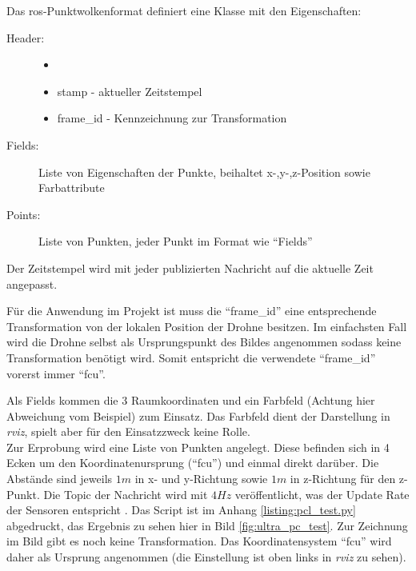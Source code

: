 Das \acrshort{ros}-Punktwolkenformat definiert eine Klasse mit den Eigenschaften:
\begin{description}
    \item[Header:]
    \begin{itemize}
        \item[]
        \item stamp - aktueller Zeitstempel
        \item frame\_id - Kennzeichnung zur Transformation
    \end{itemize}
    \item[Fields:] Liste von Eigenschaften der Punkte, beihaltet x-,y-,z-Position sowie Farbattribute
    \item[Points:] Liste von Punkten, jeder Punkt im Format wie \enquote{Fields}
\end{description}

Der Zeitstempel wird mit jeder publizierten Nachricht auf die aktuelle Zeit angepasst.

Für die Anwendung im Projekt ist muss die \enquote{frame\_id} eine entsprechende Transformation von der lokalen Position der Drohne besitzen. Im einfachsten Fall wird die Drohne selbst als Ursprungspunkt des Bildes angenommen sodass keine Transformation benötigt wird. Somit entspricht die verwendete \enquote{frame\_id} vorerst immer \enquote{fcu}.

Als Fields kommen die 3 Raumkoordinaten und ein Farbfeld (Achtung hier Abweichung vom Beispiel) zum Einsatz. Das Farbfeld dient der Darstellung in \textit{rviz}, spielt aber für den Einsatzzweck keine Rolle.\\

Zur Erprobung wird eine Liste von Punkten angelegt. Diese befinden sich in 4 Ecken um den Koordinatenursprung (\enquote{fcu}) und einmal direkt darüber. Die Abstände sind jeweils $1m$ in x- und y-Richtung sowie $1m$ in z-Richtung für den z-Punkt. Die Topic der Nachricht wird mit $4Hz$ veröffentlicht, was der Update Rate der Sensoren entspricht \cite[Kapitel 4.4]{markusreinErweiterungBestehenderDrohnen2023}. Das Script ist im Anhang \ref{listing:pcl_test.py} abgedruckt, das Ergebnis zu sehen hier in Bild \ref{fig:ultra_pc_test}. Zur Zeichnung im Bild gibt es noch keine Transformation. Das Koordinatensystem \enquote{fcu} wird daher als Ursprung angenommen (die Einstellung ist oben links in \textit{rviz} zu sehen).

